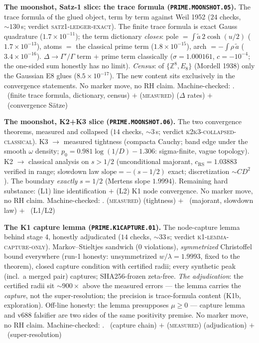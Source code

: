 \documentclass[11pt,a4paper]{article}
\theoremstyle{definition}
\begin{document}
\par\smallskip\noindent\textbf{The moonshot, Satz-1 slice: the trace
formula (\texttt{PRIME.MOONSHOT.05}).}
The trace formula of the glued object, term by term against Weil
1952 ($24$ checks, ${\sim}130$\,s; verdict
\textsc{satz1-ledger-exact}).  The finite trace formula is exact
Gauss quadrature ($1.7\times10^{-11}$); the term dictionary
\emph{closes}: pole $=\int\tilde a\,2\cosh(u/2)$
($1.7\times10^{-13}$), atoms $=$ the classical prime term
($1.8\times10^{-15}$), arch $=-\int\rho\,\tilde a$
($3.4\times10^{-16}$).  $\Delta\to\Gamma'/\Gamma$ term $+$ prime
term classically ($\sigma=1.000161$, $c=-10^{-4}$; the one-sided sum
honestly has no limit).  \emph{Census}: of $\{\mathbb{Z}^8,E_8\}$
(Mordell 1938) only the Gaussian E8 glues ($8.5\times10^{-17}$).
The new content sits exclusively in the convergence statements.  No
marker move, no RH claim.
Machine-checked: .
\mE\ (finite trace formula, dictionary, census) $+$
(\textsc{measured}) ($\Delta$ rates) $+$ \mO\ (convergence S\"atze)
\par\smallskip

\par\smallskip\noindent\textbf{The moonshot, K2+K3 slice
(\texttt{PRIME.MOONSHOT.06}).}
The two convergence theorems, measured and collapsed ($14$ checks,
${\sim}3$\,s; verdict \textsc{k2k3-collapsed-classical}).  K3
$\to$ measured tightness (compacta Cauchy; band edge under the
smooth $\omega$ density; $p_0=0.981\log(1/D)-1.306$: sigma-finite,
vague topology).  K2 $\to$ classical analysis on $s>1/2$
(unconditional majorant, $c_{\mathrm{RS}}=1.03883$ verified in
range; slowdown law $\mathrm{slope}=-(s-1/2)$ exact; discretization
$\sim CD^2$).  The boundary \emph{exactly} $s=1/2$ (Mertens slope
$1.9994$).  Remaining hard substance: (L1) line identification $+$
(L2) K1 node convergence.  No marker move, no RH claim.
Machine-checked: .
(\textsc{measured}) (tightness) $+$ \mE\ (majorant, slowdown law) $+$
\mO\ (L1/L2)
\par\smallskip

\par\smallskip\noindent\textbf{The K1 capture lemma
(\texttt{PRIME.K1CAPTURE.01}).}
The node-capture lemma behind stage 4, honestly adjudicated ($14$
checks, ${\sim}33$\,s; verdict \textsc{k1-lemma-capture-only}).
Markov--Stieltjes sandwich ($0$ violations), \emph{symmetrized}
Christoffel bound everywhere (run-1 honesty: unsymmetrized
$w/\lambda=1.9993$, fixed to the theorem), closed capture condition
with certified radii; every synthetic peak (incl.\ a merged pair)
captures; SHA256-frozen zeta-free.  \emph{The adjudication}: the
certified radii sit ${\sim}900\times$ above the measured errors ---
the lemma carries the \emph{capture}, not the super-resolution; the
precision is trace-formula content (K1b, exploration).  Off-line
honesty: the lemma presupposes $\mu\ge0$ --- capture lemma and v688
falsifier are two sides of the same positivity premise.  No marker
move, no RH claim.
Machine-checked: .
\mE\ (capture chain) $+$ (\textsc{measured}) (adjudication) $+$ \mO\
(super-resolution)
\par\smallskip
\end{document}
